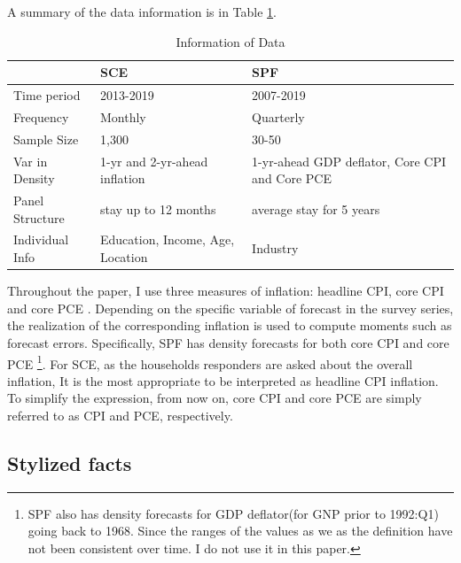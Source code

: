 \documentclass[12pt]{article}
\begin{document}
	A summary of the data information is in Table \ref{DataInfo}. 

	\begin{table}[ht]
		\caption{Information of Data}
		\label{DataInfo}
		\begin{tabularx}{\textwidth}{|X|X|X|}
			\hline 
			& SCE & SPF        \\
			\hline 
			Time period                                    & 2013-2019                           &
			 2007-2019             \\
			 \hline 
			Frequency                                      & Monthly                                 & Quarterly                \\
			\hline 
			Sample Size                                    & 1,300                                   & 30-50                    \\
			\hline 
			Var in Density                       & 1-yr and 2-yr-ahead inflation          & 1-yr-ahead GDP deflator, Core CPI and Core PCE         \\
			\hline 
			Panel Structure                               & stay up to 12 months                    & average stay for 5 years \\
			\hline 
			Individual Info                        & Education, Income, Age, Location        & Industry    \\
			\hline 
		\end{tabularx}
	\end{table}
	
	Throughout the paper, I use three measures of inflation: headline CPI, core CPI and core PCE . Depending on the specific variable of forecast in the survey series, the realization of the corresponding inflation is used to compute moments such as forecast errors. Specifically, SPF has density forecasts for both core CPI and core PCE \footnote{SPF also  has density forecasts for GDP deflator(for GNP prior to 1992:Q1) going back to 1968. Since the ranges of the values as we as the definition have not been consistent over time. I do not use it in this paper.}. For SCE, as the households responders are asked about the overall inflation, It is the most appropriate to be interpreted as  headline CPI inflation. To simplify the expression, from now on, core CPI and core PCE are simply referred to as CPI and PCE, respectively. 

	\subsection{Stylized facts}
	
\end{document}
